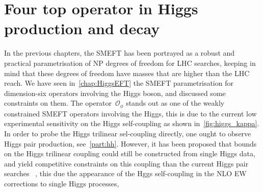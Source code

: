 

\chapter{ Four top operator in Higgs production and decay}\label{chap:4topSingleHiggs}


%
\par In the previous chapters, the SMEFT has been portrayed as  a robust and practical parametrisation of NP degrees of freedom for LHC searches, keeping in mind that these degrees of freedom have masses that are higher than the LHC reach. We have seen in~\autoref{chap:HiggsEFT} the SMEFT parametrisation for dimension-six operators involving the Higgs boson, and discussed some constraints on them. The operator~$ \mathcal O _{\phi}$ stands out as one of the weakly constrained SMEFT operators involving the Higgs, this is due to the current low experimental sensitivity on the Higgs self-coupling as shown in~\autoref{fig:higgs_kappa}. In order to probe the Higgs trilinear sel-coupling directly, one ought to observe Higgs pair production, see~\autoref{part:hh}. However, it has been proposed that bounds on the Higgs trilinear coupling could still be constructed from single Higgs data, and yield competitive constraints on this coupling than the current Higgs pair searches~ \cite{McCullough:2013rea, Gorbahn:2016uoy, Degrassi:2016wml, Bizon:2016wgr, Maltoni:2017ims, Degrassi:2019yix, Degrassi:2021uik, Haisch:2021hvy}, this due the appearance of the Hggs self-coupling in the NLO EW corrections to single Higgs processes, 
